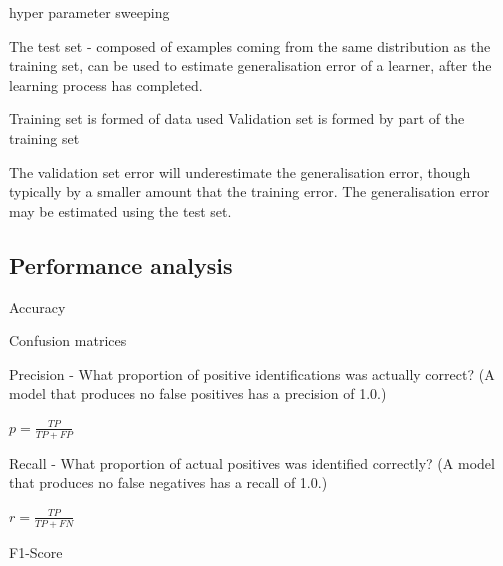hyper parameter sweeping

The test set - composed of examples coming from the same distribution as the training set, can be used to estimate generalisation error of a learner, after the learning process has completed.\cite{Goodfellow2015}

Training set is formed of data used 
Validation set is formed by part of the training set

The validation set error will underestimate the generalisation error, though typically by a smaller amount that the training error. The generalisation error may be estimated using the test set.\cite{Goodfellow2015}

\subsection{Performance analysis}
Accuracy

Confusion matrices

Precision - What proportion of positive identifications was actually correct? (A model that produces no false positives has a precision of 1.0.)

$p = \frac{TP}{TP + FP} $

Recall - What proportion of actual positives was identified correctly? (A model that produces no false negatives has a recall of 1.0.)

$r = \frac{TP}{TP + FN}$

F1-Score
